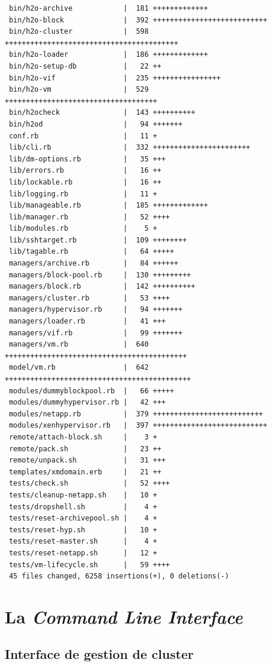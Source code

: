 \begin{lstlisting}
 bin/h2o-archive            |  181 +++++++++++++
 bin/h2o-block              |  392 +++++++++++++++++++++++++++
 bin/h2o-cluster            |  598 +++++++++++++++++++++++++++++++++++++++++
 bin/h2o-loader             |  186 +++++++++++++
 bin/h2o-setup-db           |   22 ++
 bin/h2o-vif                |  235 ++++++++++++++++
 bin/h2o-vm                 |  529 ++++++++++++++++++++++++++++++++++++
 bin/h2ocheck               |  143 ++++++++++
 bin/h2od                   |   94 +++++++
 conf.rb                    |   11 +
 lib/cli.rb                 |  332 +++++++++++++++++++++++
 lib/dm-options.rb          |   35 +++
 lib/errors.rb              |   16 ++
 lib/lockable.rb            |   16 ++
 lib/logging.rb             |   11 +
 lib/manageable.rb          |  185 +++++++++++++
 lib/manager.rb             |   52 ++++
 lib/modules.rb             |    5 +
 lib/sshtarget.rb           |  109 ++++++++
 lib/tagable.rb             |   64 +++++
 managers/archive.rb        |   84 ++++++
 managers/block-pool.rb     |  130 +++++++++
 managers/block.rb          |  142 ++++++++++
 managers/cluster.rb        |   53 ++++
 managers/hypervisor.rb     |   94 +++++++
 managers/loader.rb         |   41 +++
 managers/vif.rb            |   99 +++++++
 managers/vm.rb             |  640 +++++++++++++++++++++++++++++++++++++++++++
 model/vm.rb                |  642 ++++++++++++++++++++++++++++++++++++++++++++
 modules/dummyblockpool.rb  |   66 +++++
 modules/dummyhypervisor.rb |   42 +++
 modules/netapp.rb          |  379 ++++++++++++++++++++++++++
 modules/xenhypervisor.rb   |  397 +++++++++++++++++++++++++++
 remote/attach-block.sh     |    3 +
 remote/pack.sh             |   23 ++
 remote/unpack.sh           |   31 +++
 templates/xmdomain.erb     |   21 ++
 tests/check.sh             |   52 ++++
 tests/cleanup-netapp.sh    |   10 +
 tests/dropshell.sh         |    4 +
 tests/reset-archivepool.sh |    4 +
 tests/reset-hyp.sh         |   10 +
 tests/reset-master.sh      |    4 +
 tests/reset-netapp.sh      |   12 +
 tests/vm-lifecycle.sh      |   59 ++++
 45 files changed, 6258 insertions(+), 0 deletions(-)
\end{lstlisting}

\section{La \emph{Command Line Interface}}
\label{CLIH2O}
\subsection{Interface de gestion de cluster}

